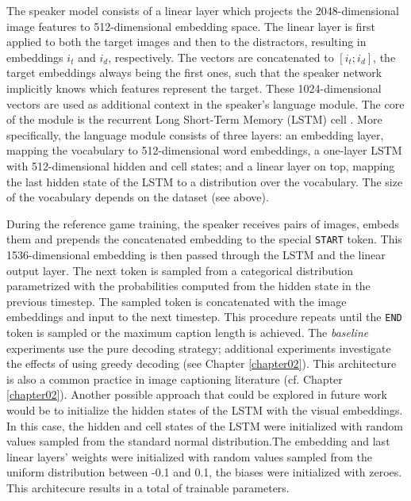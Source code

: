The speaker model consists of a linear layer which projects the 2048-dimensional image features to 512-dimensional embedding space. The linear layer is first applied to both the target images and then to the distractors, resulting in embeddings $i_t$ and $i_d$, respectively. The vectors are concatenated to $[i_t; i_d]$, the target embeddings always being the first ones, such that the speaker network implicitly knows which features represent the target. These 1024-dimensional vectors are used as additional context in the speaker's language module. The core of the module is the recurrent Long Short-Term Memory (LSTM) cell \parencite{hochreiter1997long}. More specifically, the language module consists of three layers: an embedding layer, mapping the vocabulary to 512-dimensional word embeddings, a one-layer LSTM with 512-dimensional hidden and cell states; and a linear layer on top, mapping the last hidden state of the LSTM to a distribution over the vocabulary. The size of the vocabulary depends on the dataset (see above).

During the reference game training, the speaker receives pairs of images, embeds them and prepends the concatenated embedding to the special \texttt{START} token. This 1536-dimensional embedding is then passed through the LSTM and the linear output layer. The next token is sampled from a categorical distribution parametrized with the probabilities computed from the hidden state in the previous timestep. The sampled token is concatenated with the image embeddings and input to the next timestep. This procedure repeats until the \texttt{END} token is sampled or the maximum caption length is achieved. The \textit{baseline} experiments use the pure decoding strategy; additional experiments investigate the effects of using greedy decoding (see Chapter \ref{chapter02}). This architecture is also a common practice in image captioning literature (cf. Chapter \ref{chapter02}). Another possible approach that could be explored in future work would be to initialize the hidden states of the LSTM with the visual embeddings. In this case, the hidden and cell states of the LSTM were initialized with random values sampled from the standard normal distribution.The embedding and last linear layers' weights were initialized with random values sampled from the uniform distribution between -0.1 and 0.1, the biases were initialized with zeroes.  
This architecure results in a total of  trainable parameters.  %

